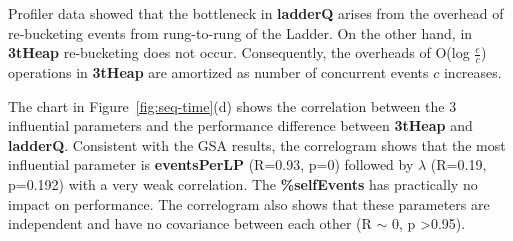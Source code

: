 Profiler data showed that the bottleneck in \textbf{ladderQ} arises from the overhead of re-bucketing events from rung-to-rung of the Ladder. On the other hand, in \textbf{3tHeap} re-bucketing does not occur. Consequently, the overheads of O(log $\frac{e}{c}$) operations in \textbf{3tHeap} are amortized as number of concurrent events $c$ increases.

The chart in Figure~\ref{fig:seq-time}(d) shows the correlation between the 3 influential parameters and the performance difference between \textbf{3tHeap} and \textbf{ladderQ}. Consistent with the GSA results, the correlogram shows that the most influential parameter is \textbf{eventsPerLP} (R=0.93, p=0) followed by $\lambda$ (R=0.19, p=0.192) with a very weak correlation. The \textbf{\%selfEvents} has practically no impact on performance. The correlogram also shows that these parameters are independent and have no covariance between each other
(R $\sim$ 0, p \textgreater 0.95).

